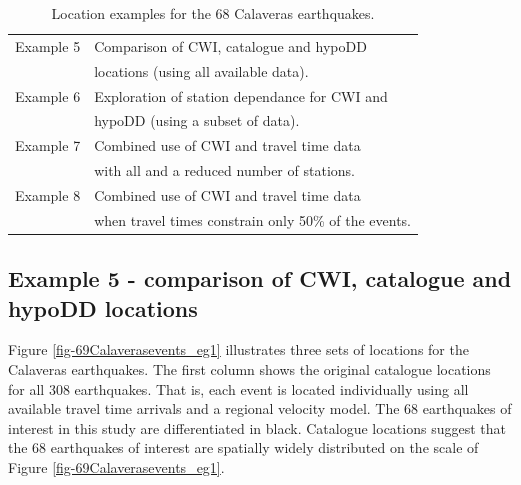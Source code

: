 \documentclass[extra, onecolumn, doublespacing]{gji}
\begin{document}
\begin{table}
\caption{Location examples for the 68 Calaveras earthquakes.}
\label{tab:examples}
\begin{tabular}{ll}
\hline
Example 5 & Comparison of CWI, catalogue and hypoDD \\
 & locations (using all available data). \\
Example 6 & Exploration of station dependance for CWI and \\
 & hypoDD (using a subset of data). \\
Example 7 & Combined use of CWI and travel time data \\
& with all and a reduced number of stations. \\
Example 8 & Combined use of CWI and travel time data \\
 & when travel times constrain only 50\% of the events. \\
 \hline
\end{tabular}
\end{table}



\subsection{Example 5 - comparison of CWI, catalogue and hypoDD locations}

Figure \ref{fig-69Calaverasevents_eg1} illustrates three sets of
locations for the Calaveras earthquakes. The first column shows the
original catalogue locations for all 308 earthquakes. That is, each event
is located individually using all available travel time arrivals and
a regional velocity model. The 68 earthquakes of interest in this
study are differentiated in black. Catalogue locations suggest that
the 68 earthquakes of interest are spatially widely distributed on the scale of
 Figure \ref{fig-69Calaverasevents_eg1}.

\end{document}
